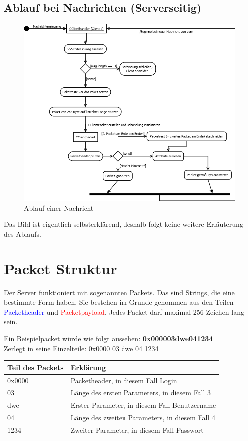 \documentclass[a4paper,12pt]{scrartcl}
\begin{document}
\subsection{Ablauf bei Nachrichten (Serverseitig)}
\begin{figure}[h]
	\centering
	\includegraphics[width=17cm]{Bilder/Ablauf_Nachricht.png}
	\caption{Ablauf einer Nachricht}
\end{figure}
Das Bild ist eigentlich selbsterklärend, deshalb folgt keine weitere Erläuterung des Ablaufs.
\clearpage

\section{Packet Struktur}
Der Server funktioniert mit sogenannten Packets. Das sind Strings, die eine bestimmte Form haben. Sie bestehen im Grunde genommen aus den Teilen \textcolor{blue}{Packetheader} und \textcolor{red}{Packetpayload}. Jedes Packet darf maximal 256 Zeichen lang sein.

Ein Beispielpacket würde wie folgt aussehen: \textbf{0x000003dwe041234}\\
Zerlegt in seine Einzelteile: 0x0000 03 dwe 04 1234\\
\begin{table}[h]
    \centering
    \begin{tabular}{|l|l|}
    \hline
    \textbf{Teil des Packets} & \textbf{Erklärung}                                      \\ \hline
    0x0000           & Packetheader, in diesem Fall Login             \\ \hline
    03               & Länge des ersten Parameters, in diesem Fall 3  \\ \hline
    dwe              & Erster Parameter, in diesem Fall Benutzername  \\ \hline
    04               & Länge des zweiten Parameters, in diesem Fall 4 \\ \hline
    1234             & Zweiter Parameter, in diesem Fall Passwort     \\ \hline
    \end{tabular}
\end{table}
\end{document}
